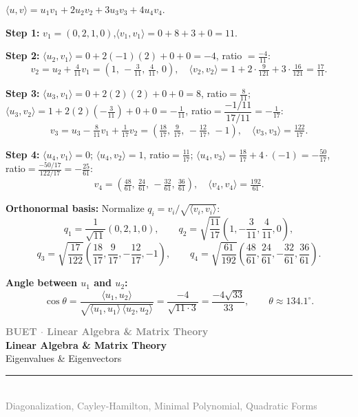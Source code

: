 \documentclass[12pt,a3paper]{article}
\newcommand{\secdivider}[4]{%
  \newpage\thispagestyle{empty}%
  \vspace*{\fill}%
  \begin{tcolorbox}[enhanced,colback=#4!7,colframe=#3,boxrule=1.5pt,arc=8pt,
    left=20pt,right=20pt,top=22pt,bottom=22pt,
    shadow={3pt}{-3pt}{0pt}{black!15}]
    \centering
    {\large\textcolor{gray}{\textbf{BUET $\cdot$ Linear Algebra \& Matrix Theory}}}\\[8pt]
    {\fontsize{26}{32}\selectfont\bfseries\textcolor{#3}{Linear Algebra \& Matrix Theory}}\\[6pt]
    {\fontsize{15}{19}\selectfont\textcolor{dgray}{#1}}\\[12pt]
    \textcolor{#3!60}{\rule{0.5\textwidth}{0.5pt}}\\[6pt]
    {\small\textcolor{gray}{#2}}
  \end{tcolorbox}%
  \vspace*{\fill}\newpage%
}
\begin{document}
\begin{tcolorbox}[enhanced,breakable,colback=cD!4,colframe=cD,boxrule=0.8pt,arc=5pt,title={\textbf{Answer --- Gram-Schmidt with Weighted Inner Product on $\mathbb{R}^4$}},fonttitle=\bfseries\color{white},colbacktitle=cD]
$\langle u,v\rangle = u_1v_1+2u_2v_2+3u_3v_3+4u_4v_4$.

\textbf{Step 1:} $v_1=(0,2,1,0)$,\quad $\langle v_1,v_1\rangle=0+8+3+0=11$.

\textbf{Step 2:}
$\langle u_2,v_1\rangle=0+2(-1)(2)+0+0=-4$,\; ratio $=\tfrac{-4}{11}$:
$$v_2=u_2+\tfrac{4}{11}v_1=\left(1,\,-\tfrac{3}{11},\,\tfrac{4}{11},\,0\right),\quad
\langle v_2,v_2\rangle=1+2\cdot\tfrac{9}{121}+3\cdot\tfrac{16}{121}=\tfrac{17}{11}.$$

\textbf{Step 3:}
$\langle u_3,v_1\rangle=0+2(2)(2)+0+0=8$,\; ratio$=\tfrac{8}{11}$;\quad
$\langle u_3,v_2\rangle=1+2(2)\!\left(-\tfrac{3}{11}\right)+0+0=-\tfrac{1}{11}$,\; ratio$=\dfrac{-1/11}{17/11}=-\tfrac{1}{17}$:
$$v_3=u_3-\tfrac{8}{11}v_1+\tfrac{1}{17}v_2
=\left(\tfrac{18}{17},\,\tfrac{9}{17},\,-\tfrac{12}{17},\,-1\right),\quad
\langle v_3,v_3\rangle=\tfrac{122}{17}.$$

\textbf{Step 4:}
$\langle u_4,v_1\rangle=0$;\; $\langle u_4,v_2\rangle=1$,\; ratio$=\tfrac{11}{17}$;\;
$\langle u_4,v_3\rangle=\tfrac{18}{17}+4\cdot(-1)=-\tfrac{50}{17}$,\; ratio$=\tfrac{-50/17}{122/17}=-\tfrac{25}{61}$:
$$v_4=\left(\tfrac{48}{61},\,\tfrac{24}{61},\,-\tfrac{32}{61},\,\tfrac{36}{61}\right),\quad
\langle v_4,v_4\rangle=\tfrac{192}{61}.$$

\textbf{Orthonormal basis:}
Normalize $q_i = v_i / \sqrt{\langle v_i,v_i \rangle}$:
$$q_1=\frac{1}{\sqrt{11}}(0,2,1,0),\qquad
q_2=\sqrt{\frac{11}{17}}\left(1,-\frac{3}{11},\frac{4}{11},0\right),$$
$$q_3=\sqrt{\frac{17}{122}}\left(\frac{18}{17},\frac{9}{17},-\frac{12}{17},-1\right),\qquad
q_4=\sqrt{\frac{61}{192}}\left(\frac{48}{61},\frac{24}{61},-\frac{32}{61},\frac{36}{61}\right).$$

\medskip
\textbf{Angle between $u_1$ and $u_2$:}
$$\cos\theta=\frac{\langle u_1,u_2\rangle}{\sqrt{\langle u_1,u_1\rangle\,\langle u_2,u_2\rangle}}
=\frac{-4}{\sqrt{11\cdot3}}=\frac{-4\sqrt{33}}{33},\qquad
\theta\approx134.1^\circ.$$
\end{tcolorbox}


\secdivider{Eigenvalues \& Eigenvectors}{Diagonalization, Cayley-Hamilton, Minimal Polynomial, Quadratic Forms}{cE}{orange}

\label{sec:S5}
\end{document}
